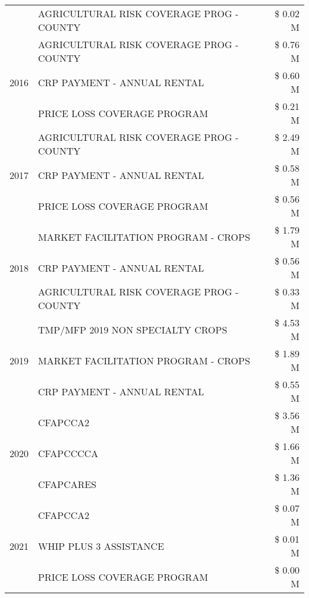 \begin{tabular}{llr}
 & AGRICULTURAL RISK COVERAGE PROG - COUNTY & \$ 0.02 M \\
\cline{1-3}
\multirow[t]{3}{*}{2016} & AGRICULTURAL RISK COVERAGE PROG - COUNTY & \$ 0.76 M \\
 & CRP PAYMENT - ANNUAL RENTAL & \$ 0.60 M \\
 & PRICE LOSS COVERAGE PROGRAM & \$ 0.21 M \\
\cline{1-3}
\multirow[t]{3}{*}{2017} & AGRICULTURAL RISK COVERAGE PROG - COUNTY & \$ 2.49 M \\
 & CRP PAYMENT - ANNUAL RENTAL & \$ 0.58 M \\
 & PRICE LOSS COVERAGE PROGRAM & \$ 0.56 M \\
\cline{1-3}
\multirow[t]{3}{*}{2018} & MARKET FACILITATION PROGRAM - CROPS & \$ 1.79 M \\
 & CRP PAYMENT - ANNUAL RENTAL & \$ 0.56 M \\
 & AGRICULTURAL RISK COVERAGE PROG - COUNTY & \$ 0.33 M \\
\cline{1-3}
\multirow[t]{3}{*}{2019} & TMP/MFP 2019 NON SPECIALTY CROPS & \$ 4.53 M \\
 & MARKET FACILITATION PROGRAM - CROPS & \$ 1.89 M \\
 & CRP PAYMENT - ANNUAL RENTAL & \$ 0.55 M \\
\cline{1-3}
\multirow[t]{3}{*}{2020} & CFAPCCA2 & \$ 3.56 M \\
 & CFAPCCCCA & \$ 1.66 M \\
 & CFAPCARES & \$ 1.36 M \\
\cline{1-3}
\multirow[t]{3}{*}{2021} & CFAPCCA2 & \$ 0.07 M \\
 & WHIP PLUS 3 ASSISTANCE & \$ 0.01 M \\
 & PRICE LOSS COVERAGE PROGRAM & \$ 0.00 M \\
\cline{1-3}
\bottomrule
\end{tabular}
